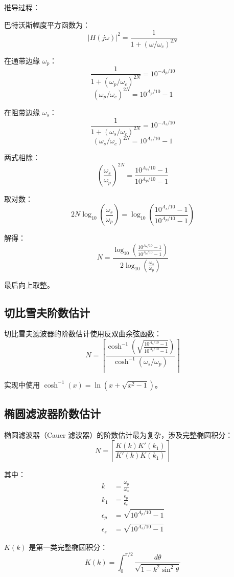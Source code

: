 ﻿\documentclass[12pt,a4paper,oneside]{ctexbook}
\begin{document}
推导过程：

巴特沃斯幅度平方函数为：
\[
|H(j\omega)|^2 = \frac{1}{1 + (\omega/\omega_c)^{2N}}
\]

在通带边缘 \(\omega_p\)：
\[
\frac{1}{1 + (\omega_p/\omega_c)^{2N}} = 10^{-A_p/10}
\]
\[
(\omega_p/\omega_c)^{2N} = 10^{A_p/10} - 1
\]

在阻带边缘 \(\omega_s\)：
\[
\frac{1}{1 + (\omega_s/\omega_c)^{2N}} = 10^{-A_s/10}
\]
\[
(\omega_s/\omega_c)^{2N} = 10^{A_s/10} - 1
\]

两式相除：
\[
\left(\frac{\omega_s}{\omega_p}\right)^{2N} = \frac{10^{A_s/10} - 1}{10^{A_p/10} - 1}
\]

取对数：
\[
2N \log_{10}\left(\frac{\omega_s}{\omega_p}\right) = \log_{10}\left(\frac{10^{A_s/10} - 1}{10^{A_p/10} - 1}\right)
\]

解得：
\[
N = \frac{\log_{10}\left(\frac{10^{A_s/10} - 1}{10^{A_p/10} - 1}\right)}{2 \log_{10}\left(\frac{\omega_s}{\omega_p}\right)}
\]

最后向上取整。

\subsection{切比雪夫阶数估计}

切比雪夫滤波器的阶数估计使用反双曲余弦函数：
\[
N = \left\lceil \frac{\cosh^{-1}\left(\sqrt{\frac{10^{A_s/10} - 1}{10^{A_p/10} - 1}}\right)}{\cosh^{-1}(\omega_s/\omega_p)} \right\rceil
\]

实现中使用 \(\cosh^{-1}(x) = \ln(x + \sqrt{x^2 - 1})\)。

\subsection{椭圆滤波器阶数估计}

椭圆滤波器（Cauer 滤波器）的阶数估计最为复杂，涉及完整椭圆积分：
\[
N = \left\lceil \frac{K(k) K'(k_1)}{K'(k) K(k_1)} \right\rceil
\]

其中：
\begin{align*}
k &= \frac{\omega_p}{\omega_s} \\
k_1 &= \frac{\epsilon_p}{\epsilon_s} \\
\epsilon_p &= \sqrt{10^{A_p/10} - 1} \\
\epsilon_s &= \sqrt{10^{A_s/10} - 1}
\end{align*}

\(K(k)\) 是第一类完整椭圆积分：
\[
K(k) = \int_0^{\pi/2} \frac{d\theta}{\sqrt{1 - k^2 \sin^2\theta}}
\]
\end{document}
